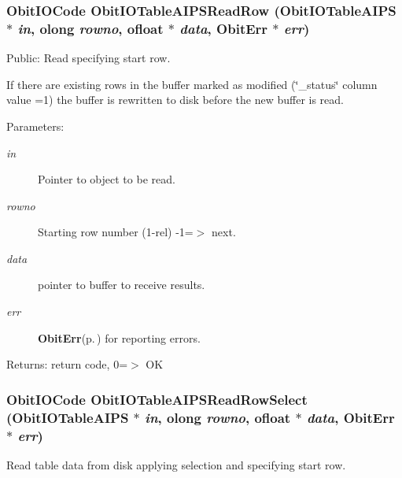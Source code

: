\subsubsection{\setlength{\rightskip}{0pt plus 5cm}Obit\-IOCode Obit\-IOTable\-AIPSRead\-Row ({\bf Obit\-IOTable\-AIPS} $\ast$ {\em in}, {\bf olong} {\em rowno}, {\bf ofloat} $\ast$ {\em data}, {\bf Obit\-Err} $\ast$ {\em err})}\label{ObitIOTableAIPS_8c_a17}


Public: Read specifying start row. 

If there are existing rows in the buffer marked as modified (\char`\"{}\_\-status\char`\"{} column value =1) the buffer is rewritten to disk before the new buffer is read. \begin{Desc}
\item[Parameters:]
\begin{description}
\item[{\em in}]Pointer to object to be read. \item[{\em rowno}]Starting row number (1-rel) -1=$>$ next. \item[{\em data}]pointer to buffer to receive results. \item[{\em err}]{\bf Obit\-Err}{\rm (p.\,\pageref{structObitErr})} for reporting errors. \end{description}
\end{Desc}
\begin{Desc}
\item[Returns:]return code, 0=$>$ OK \end{Desc}
\subsubsection{\setlength{\rightskip}{0pt plus 5cm}Obit\-IOCode Obit\-IOTable\-AIPSRead\-Row\-Select ({\bf Obit\-IOTable\-AIPS} $\ast$ {\em in}, {\bf olong} {\em rowno}, {\bf ofloat} $\ast$ {\em data}, {\bf Obit\-Err} $\ast$ {\em err})}\label{ObitIOTableAIPS_8c_a19}


Read table data from disk applying selection and specifying start row. 

